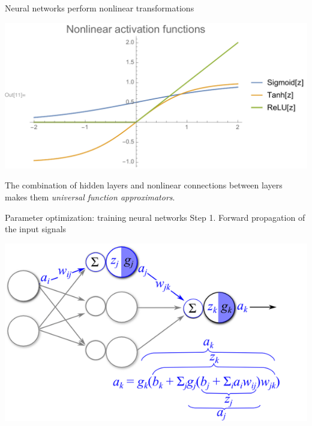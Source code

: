 \documentclass[xetex,compress]{beamer}
\begin{document}
\begin{frame}{Neural networks perform nonlinear transformations}
  \begin{center}
    \includegraphics[width=1.00\textwidth]{./figures/nonlinear_activation.pdf}
  \end{center}
  The combination of hidden layers and nonlinear connections between layers makes them \emph{universal function approximators}.
\end{frame}


\begin{frame}{Parameter optimization: training neural networks}
  Step 1. Forward propagation of the input signals
  \begin{center}
    \includegraphics[width=1.00\textwidth]{./figures/backprop_1.png}
  \end{center}
\end{frame}
\end{document}
